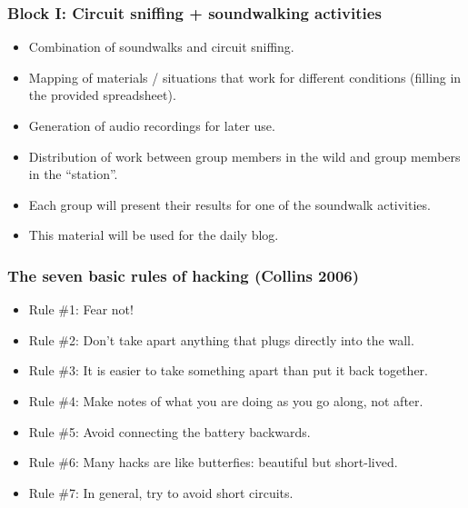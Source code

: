 \documentclass[screen, aspectratio=43]{beamer}
\begin{document}
%
\begin{frame}
  \frametitle{Block I: Circuit sniffing + soundwalking activities}
        \begin{itemize}
	\item Combination of soundwalks and circuit sniffing.
	\item Mapping of materials / situations that work for different conditions (filling in the provided spreadsheet).
	\item Generation of audio recordings for later use.
	\item Distribution of work between group members in the wild and group members in the ``station''. 
	\item Each group will present their results for one of the soundwalk activities.
	\item This material will be used for the daily blog.
    \end{itemize} 
\end{frame}
%
\begin{frame}
  \frametitle{The seven basic rules of hacking (Collins 2006)}
        \begin{itemize}
	\item Rule \#1: Fear not!
	\item Rule \#2: Don't take apart anything that plugs directly into the wall.
	\item Rule \#3: It is easier to take something apart than put it back together.
	\item Rule \#4: Make notes of what you are doing as you go along, not after.
	\item Rule \#5: Avoid connecting the battery backwards.
	\item Rule \#6: Many hacks are like butterfies: beautiful but short-lived.
	\item Rule \#7: In general, try to avoid short circuits.
    \end{itemize} 
\end{frame}
%
\end{document}
